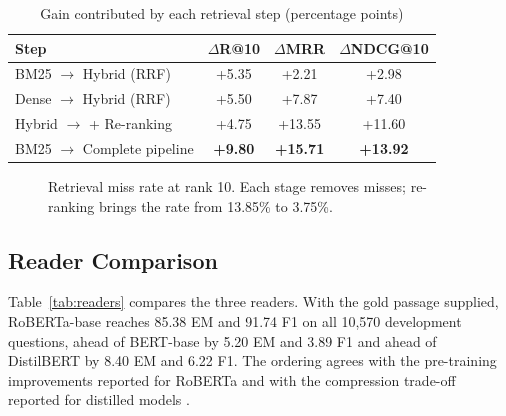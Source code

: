 \documentclass[conference]{IEEEtran}
\newcommand{\best}[1]{\textbf{#1}}
\begin{document}
\begin{table}[t]
\centering
\caption{Gain contributed by each retrieval step (percentage points)}
\label{tab:gains}
\footnotesize
\begin{tabular}{@{}lccc@{}}
\toprule
\textbf{Step} & $\Delta$\textbf{R@10} & $\Delta$\textbf{MRR} & $\Delta$\textbf{NDCG@10} \\
\midrule
BM25 $\rightarrow$ Hybrid (RRF)        & +5.35 & +2.21  & +2.98 \\
Dense $\rightarrow$ Hybrid (RRF)       & +5.50 & +7.87  & +7.40 \\
Hybrid $\rightarrow$ + Re-ranking      & +4.75 & +13.55 & +11.60 \\
BM25 $\rightarrow$ Complete pipeline   & \best{+9.80} & \best{+15.71} & \best{+13.92} \\
\bottomrule
\end{tabular}
\end{table}

\begin{figure}[t]
\centering
{}
\caption{Retrieval miss rate at rank 10. Each stage removes misses; re-ranking brings the rate
from 13.85\% to 3.75\%.}
\label{fig:miss}
\end{figure}

\subsection{Reader Comparison}
Table~\ref{tab:readers} compares the three readers. With the gold passage supplied, RoBERTa-base
reaches 85.38 EM and 91.74 F1 on all 10,570 development questions, ahead of BERT-base by 5.20 EM
and 3.89 F1 and ahead of DistilBERT by 8.40 EM and 6.22 F1. The ordering agrees with the
pre-training improvements reported for RoBERTa \cite{liu2019} and with the compression
trade-off reported for distilled models \cite{sanh2019,huang2023}.
\end{document}
